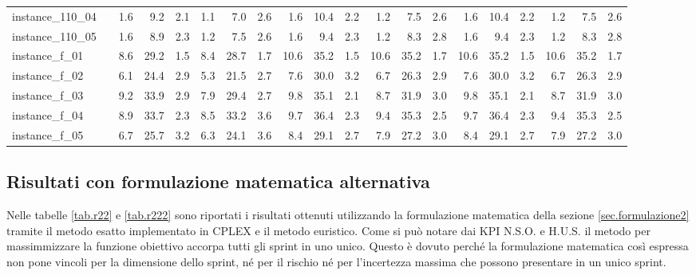 \documentclass[12pt,a4paper,openright,twoside]{book}
\begin{document}
\begin{table}[H]
{\begin{tabular}{|ll|rrrrrr|rrrrrr|rrrrrr|}
 instance\_110\_04            &     &       1.6  &   9.2  &  2.1  &   1.1  &   7.0  &  2.6  &        1.6  &   10.4  &  2.2  &   1.2  &   7.5  &  2.6       &   1.6  &   10.4  &  2.2  &   1.2  &   7.5  &  2.6    \\           
 instance\_110\_05            &     &       1.6  &   8.9  &  2.3  &   1.2  &   7.5  &  2.6  &        1.6  &   9.4  &  2.3  &   1.2  &   8.3  &  2.8       &   1.6  &   9.4  &  2.3  &   1.2  &   8.3  &  2.8    \\         
 instance\_f\_01              &     &      8.6  &   29.2  &  1.5  &   8.4  &   28.7  &  1.7  &      10.6  &   35.2  &  1.5  &   10.6  &   35.2  &  1.7      &  10.6  &   35.2  &  1.5  &   10.6  &   35.2  &  1.7   \\       
 instance\_f\_02              &     &       6.1  &   24.4  &  2.9  &   5.3  &   21.5  &  2.7  &      7.6  &   30.0  &  3.2  &   6.7  &   26.3  &  2.9      &   7.6  &   30.0  &  3.2  &   6.7  &   26.3  &  2.9   \\         
 instance\_f\_03              &     &      9.2  &   33.9  &  2.9  &   7.9  &   29.4  &  2.7  &      9.8  &   35.1  &  2.1  &   8.7  &   31.9  &  3.0     &   9.8  &   35.1  &  2.1  &   8.7  &   31.9  &  3.0   \\   
 instance\_f\_04              &     &       8.9  &   33.7  &  2.3  &   8.5  &   33.2  &  3.6  &      9.7  &   36.4  &  2.3  &   9.4  &   35.3  &  2.5      &   9.7  &   36.4  &  2.3  &   9.4  &   35.3  &  2.5   \\         
 instance\_f\_05              &     &      6.7  &   25.7  &  3.2  &   6.3  &   24.1  &  3.6  &      8.4  &   29.1  &  2.7  &   7.9  &   27.2  &  3.0     &   8.4  &   29.1  &  2.7  &   7.9  &   27.2  &  3.0   \\   
  \hline
\end{tabular}
}
\end{table}

\subsection{Risultati con formulazione matematica alternativa}\label{risultati.alternativi}

Nelle tabelle \ref{tab.r22} e \ref{tab.r222} sono riportati i risultati ottenuti utilizzando la formulazione matematica della sezione \ref{sec.formulazione2} tramite il metodo esatto implementato in CPLEX e il metodo euristico.
Come si può notare dai KPI N.S.O. e H.U.S. il metodo per massimmizzare la funzione obiettivo accorpa tutti gli sprint in uno unico. Questo è dovuto perché la formulazione matematica così espressa non pone vincoli per la dimensione dello sprint, né per il rischio né per l'incertezza massima che possono presentare in un unico sprint.
\end{document}
